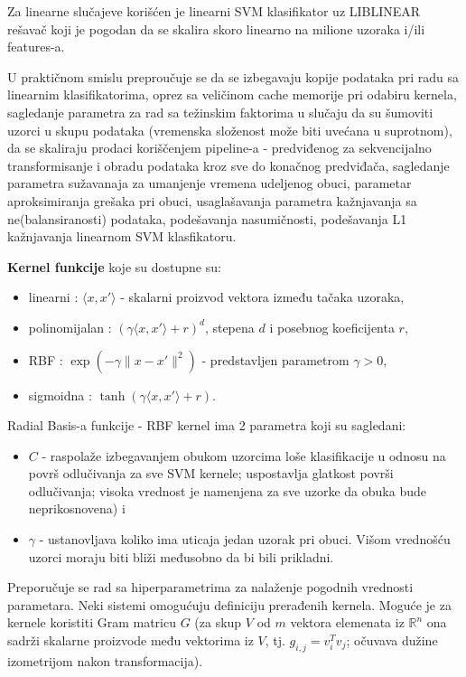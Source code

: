 \documentclass[fontsize=12bp, paper=a4]{scrarticle}
\begin{document}
Za linearne slučajeve korišćen je linearni SVM klasifikator uz LIBLINEAR rešavač koji je pogodan da se skalira skoro linearno na milione uzoraka i/ili features-a. 

U praktičnom smislu preproučuje se da se izbegavaju kopije podataka pri radu sa linearnim klasifikatorima, oprez sa veličinom cache memorije pri odabiru kernela, sagledanje parametra za rad sa težinskim faktorima u slučaju da su šumoviti uzorci u skupu podataka (vremenska složenost može biti uvećana u suprotnom), da se skaliraju prodaci koriščenjem pipeline-a\cite{pipeline} - predviđenog za sekvencijalno transformisanje i obradu podataka kroz sve do konačnog predviđača, sagledanje parametra sužavanaja za umanjenje vremena udeljenog obuci, parametar aproksimiranja grešaka pri obuci, usaglašavanja parametra kažnjavanja sa ne(balansiranosti) podataka, podešavanja nasumičnosti, podešavanja L1 kažnjavanja linearnom SVM klasfikatoru.

\vbox{}
\textbf{Kernel funkcije} koje su dostupne su:
\begin{itemize}
    \item linearni : $\langle x, x'\rangle$ - skalarni proizvod vektora između tačaka uzoraka,
    \item polinomijalan : $(\gamma \langle x, x'\rangle + r)^d$, stepena $d$ i posebnog koeficijenta $r$,
    \item RBF : $\exp(-\gamma \|x-x'\|^2)$ - predstavljen parametrom $\gamma>0$,
    \item sigmoidna : $\tanh(\gamma \langle x,x'\rangle + r)$.
\end{itemize}

\vbox{}
Radial Basis-a funkcije - RBF kernel ima 2 parametra koji su sagledani\cite{rbfparams}:

\begin{itemize}
    \item $C$ - raspolaže izbegavanjem obukom uzorcima loše klasifikacije u odnosu na površ odlučivanja za sve SVM kernele; uspostavlja glatkost površi odlučivanja; visoka vrednost je namenjena za sve uzorke da obuka bude neprikosnovena) i 
    \item $\gamma$ - ustanovljava koliko ima uticaja jedan uzorak pri obuci. Višom vrednošću uzorci moraju biti bliži međusobno da bi bili prikladni.
\end{itemize}
Preporučuje se rad sa hiperparametrima za nalaženje pogodnih vrednosti parametara.
Neki sistemi omogućuju definiciju prerađenih kernela. Moguće je za kernele koristiti Gram matricu $G$ (za skup $V$ od $m$ vektora elemenata iz $\mathbb{R}^n$ ona sadrži skalarne proizvode među vektorima iz $V$, tj. $g_{i,j} = v_i^Tv_j$; očuvava dužine izometrijom nakon transformacija)\cite{gram}\cite{isometry}.
\end{document}
